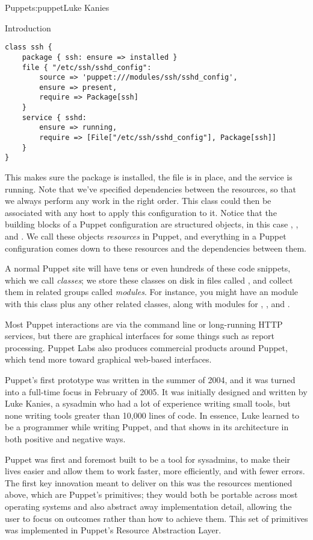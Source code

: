\begin{aosachapter}{Puppet}{s:puppet}{Luke Kanies}
\begin{aosasect1}{Introduction}
\begin{verbatim}
class ssh {
    package { ssh: ensure => installed }
    file { "/etc/ssh/sshd_config":
        source => 'puppet:///modules/ssh/sshd_config',
        ensure => present,
        require => Package[ssh]
    }
    service { sshd:
        ensure => running,
        require => [File["/etc/ssh/sshd_config"], Package[ssh]]
    }
}
\end{verbatim}

\noindent This makes sure the package is installed, the file is in place, and
the service is running.  Note that we've specified dependencies
between the resources, so that we always perform any work in the right
order.  This class could then be associated with any host to apply
this configuration to it.  Notice that the building blocks of a Puppet
configuration are structured objects, in this case , ,
and .  We call these objects \emph{resources} in Puppet, and
everything in a Puppet configuration comes down to these resources and
the dependencies between them.

A normal Puppet site will have tens or even hundreds of these code
snippets, which we call \emph{classes}; we store these classes on disk in
files called , and collect them in related groups called
\emph{modules}. For instance, you might have an  module with this
 class plus any other related classes, along with modules for
, , and .

Most Puppet interactions are via the command line or long-running HTTP
services, but there are graphical interfaces for some things such as
report processing.  Puppet Labs also produces commercial products
around Puppet, which tend more toward graphical web-based interfaces.

Puppet's first prototype was written in the summer of 2004, and it was
turned into a full-time focus in February of 2005.  It was initially
designed and written by Luke Kanies, a sysadmin who had a lot of
experience writing small tools, but none writing tools greater than
10,000 lines of code.  In essence, Luke learned to be a programmer
while writing Puppet, and that shows in its architecture in both positive and negative
ways.

Puppet was first and foremost built to be a tool for sysadmins, to 
make their lives easier and allow them to work
faster, more efficiently, and with fewer errors.  The first key
innovation meant to deliver on this was the resources mentioned above,
which are Puppet's primitives;
they would both be portable across most operating
systems and also abstract away implementation detail, allowing the
user to focus on outcomes rather than how to achieve them.  This set
of primitives was implemented in Puppet's Resource Abstraction Layer.


\end{aosasect1}
\end{aosachapter}

